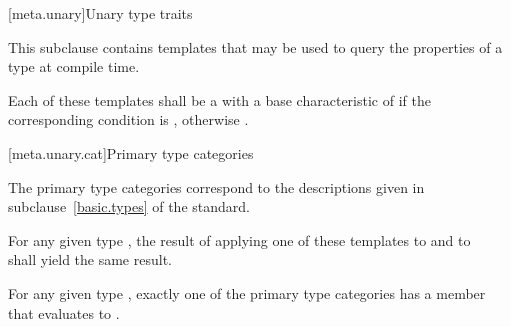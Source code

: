 [meta.unary]{Unary type traits}

\pnum
This subclause contains templates that may be used to query the
properties of a type at compile time.

\pnum
Each of these templates shall be a
with a base characteristic of
 if the corresponding condition is , otherwise
.

[meta.unary.cat]{Primary type categories}

\pnum
The primary type categories correspond to the descriptions given in
subclause~\ref{basic.types} of the \Cpp{} standard.

\pnum
For any given type , the result of applying one of these templates to
 and to \cv{}~ shall yield the same result.

\pnum
\begin{note}
For any given type , exactly one of the primary type categories
has a  member that evaluates to .
\end{note}

